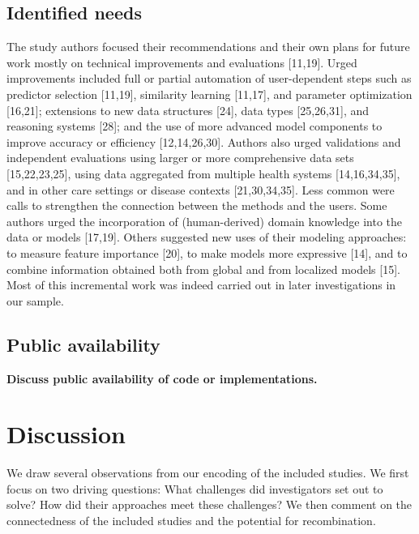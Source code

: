 \documentclass[preprint, 3p,
authoryear]{elsarticle} %
\begin{document}
\hypertarget{identified-needs}{%
\subsection{Identified needs}\label{identified-needs}}

\label{sec:needs}

The study authors focused their recommendations and their own plans for
future work mostly on technical improvements and evaluations
{[}11,19{]}. Urged improvements included full or partial automation of
user-dependent steps such as predictor selection {[}11,19{]}, similarity
learning {[}11,17{]}, and parameter optimization {[}16,21{]}; extensions
to new data structures {[}24{]}, data types {[}25,26,31{]}, and
reasoning systems {[}28{]}; and the use of more advanced model
components to improve accuracy or efficiency {[}12,14,26,30{]}. Authors
also urged validations and independent evaluations using larger or more
comprehensive data sets {[}15,22,23,25{]}, using data aggregated from
multiple health systems {[}14,16,34,35{]}, and in other care settings or
disease contexts {[}21,30,34,35{]}. Less common were calls to strengthen
the connection between the methods and the users. Some authors urged the
incorporation of (human-derived) domain knowledge into the data or
models {[}17,19{]}. Others suggested new uses of their modeling
approaches: to measure feature importance {[}20{]}, to make models more
expressive {[}14{]}, and to combine information obtained both from
global and from localized models {[}15{]}. Most of this incremental work
was indeed carried out in later investigations in our sample.

\hypertarget{public-availability}{%
\subsection{Public availability}\label{public-availability}}

\label{sec:availability}

\textbf{Discuss public availability of code or implementations.}

\hypertarget{discussion}{%
\section{Discussion}\label{discussion}}

We draw several observations from our encoding of the included studies.
We first focus on two driving questions: What challenges did
investigators set out to solve? How did their approaches meet these
challenges? We then comment on the connectedness of the included studies
and the potential for recombination.
\end{document}
